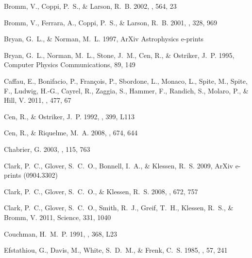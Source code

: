 \documentclass[12pt,preprint]{aastex}
\begin{document}
\begin{thebibliography}{108}
{Bromm}, V., {Coppi}, P.~S., \& {Larson}, R.~B. 2002, \apj, 564, 23

{Bromm}, V., {Ferrara}, A., {Coppi}, P.~S., \& {Larson}, R.~B. 2001, \mnras,
  328, 969

{Bryan}, G.~L., \& {Norman}, M.~L. 1997, ArXiv Astrophysics e-prints

{Bryan}, G.~L., {Norman}, M.~L., {Stone}, J.~M., {Cen}, R., \& {Ostriker},
  J.~P. 1995, Computer Physics Communications, 89, 149

{Caffau}, E., {Bonifacio}, P., {Fran{\c c}ois}, P., {Sbordone}, L., {Monaco},
  L., {Spite}, M., {Spite}, F., {Ludwig}, H.-G., {Cayrel}, R., {Zaggia}, S.,
  {Hammer}, F., {Randich}, S., {Molaro}, P., \& {Hill}, V. 2011, \nat, 477, 67

{Cen}, R., \& {Ostriker}, J.~P. 1992, \apjl, 399, L113

{Cen}, R., \& {Riquelme}, M.~A. 2008, \apj, 674, 644

{Chabrier}, G. 2003, \pasp, 115, 763

{Clark}, P.~C., {Glover}, S.~C.~O., {Bonnell}, I.~A., \& {Klessen}, R.~S. 2009,
  ArXiv e-prints (0904.3302)

{Clark}, P.~C., {Glover}, S.~C.~O., \& {Klessen}, R.~S. 2008, \apj, 672, 757

{Clark}, P.~C., {Glover}, S.~C.~O., {Smith}, R.~J., {Greif}, T.~H., {Klessen},
  R.~S., \& {Bromm}, V. 2011, Science, 331, 1040

{Couchman}, H.~M.~P. 1991, \apjl, 368, L23

{Efstathiou}, G., {Davis}, M., {White}, S.~D.~M., \& {Frenk}, C.~S. 1985,
  \apjs, 57, 241


\end{thebibliography}
\end{document}

